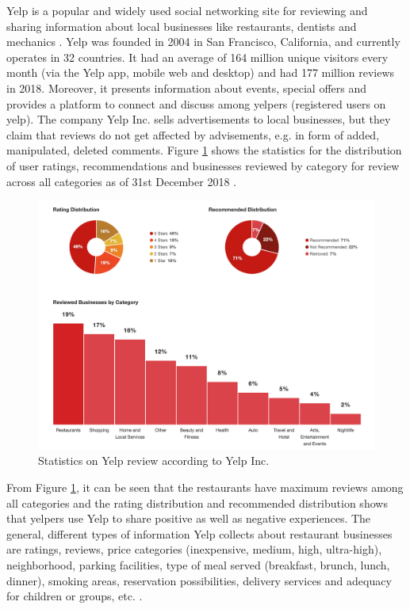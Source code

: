 \documentclass[a4paper, 11pt, oneside]{Thesis}  %
\begin{document}
Yelp is a popular and widely used social networking site for reviewing and sharing information about local businesses like restaurants, dentists and mechanics \cite{YelpInc..2018}. Yelp was founded in 2004 in San Francisco, California, and currently operates in 32 countries. It had an average of 164 million unique visitors every month (via the Yelp app, mobile web and desktop) and had 177 million reviews in 2018. Moreover, it presents information about events, special offers and provides a platform to connect and discuss among yelpers (registered users on yelp). The company Yelp Inc. sells advertisements to local businesses, but they claim that reviews do not get affected by advisements, e.g. in form of added, manipulated, deleted comments. Figure \ref{fig:yelp_factsheet_figures} shows the statistics for the distribution of user ratings, recommendations and businesses reviewed by category for review across all categories as of 31st December 2018 \cite{YelpInc..2018}.

\begin{figure}[h]
\includegraphics[scale=0.5]{Figures/Yelp_Factsheet_Figures.png}
\centering
\caption{Statistics on Yelp review according to Yelp Inc. \cite{YelpInc..2018}}
\label{fig:yelp_factsheet_figures}
\end{figure}

From Figure \ref{fig:yelp_factsheet_figures}, it can be seen that the restaurants have maximum reviews among all categories and the rating distribution and recommended distribution shows that yelpers use Yelp to share positive as well as negative experiences. The general, different types of information Yelp collects about restaurant businesses are ratings, reviews, price categories (inexpensive, medium, high, ultra-high), neighborhood, parking facilities, type of meal served (breakfast, brunch, lunch, dinner), smoking areas, reservation possibilities, delivery services and adequacy for children or groups, etc. \cite{YelpInc..2018}.  
\end{document}
